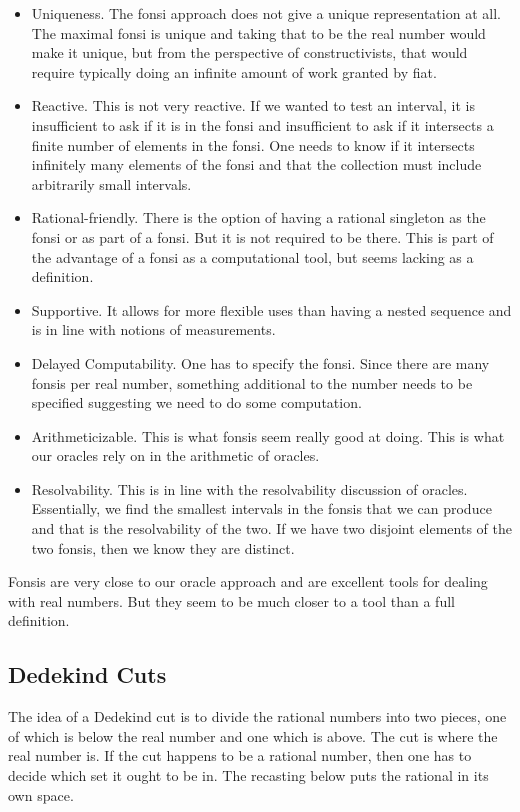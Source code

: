 \documentclass[12pt]{article}
\begin{document}
\begin{itemize}
    \item Uniqueness. The fonsi approach does not give a unique representation at all. The maximal fonsi is unique and taking that to be the real number would make it unique, but from the perspective of constructivists, that would require typically doing an infinite amount of work granted by fiat. 
    \item Reactive. This is not very reactive. If we wanted to test an interval, it is insufficient to ask if it is in the fonsi and insufficient to ask if it intersects a finite number of elements in the fonsi. One needs to know if it intersects infinitely many elements of the fonsi and that the collection must include arbitrarily small intervals. 
    \item Rational-friendly. There is the option of having a rational singleton as the fonsi or as part of a fonsi. But it is not required to be there. This is part of the advantage of a fonsi as a computational tool, but seems lacking as a definition. 
    \item Supportive. It allows for more flexible uses than having a nested sequence and is in line with notions of measurements. 
    \item Delayed Computability. One has to specify the fonsi. Since there are many fonsis per real number, something additional to the number needs to be specified suggesting we need to do some computation.
    \item Arithmeticizable. This is what fonsis seem really good at doing. This is what our oracles rely on in the arithmetic of oracles. 
    \item Resolvability. This is in line with the resolvability discussion of oracles. Essentially, we find the smallest intervals in the fonsis that we can produce and that is the resolvability of the two. If we have two disjoint elements of the two fonsis, then we know they are distinct. 
\end{itemize}

Fonsis are very close to our oracle approach and are excellent tools for dealing with real numbers. But they seem to be much closer to a tool than a full definition.
  
\subsection{Dedekind Cuts}

The idea of a Dedekind cut is to divide the rational numbers into two pieces, one of which is below the real number and one which is above. The cut is where the real number is. If the cut happens to be a rational number, then one has to decide which set it ought to be in. The recasting below puts the rational in its own space. 
\end{document}
